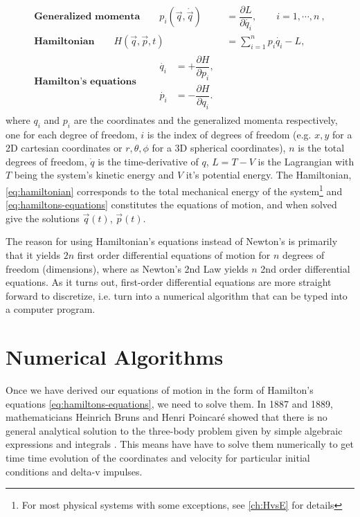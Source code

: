 \begin{align}
\textbf{Generalized momenta} \qquad p_i(\vec{q},\dot{\vec{q}}) &= \dfrac{\partial L}{\partial \dot{q_i}}, \qquad i = 1,\cdots, n \ , \label{eq:generalized-momenta} \\[1cm]
\textbf{Hamiltonian} \qquad H(\vec{q}, \vec{p}, t) &= \sum\limits_{i=1}^n p_i \dot{q_i} - L \label{eq:hamiltonian}, \\[1cm]
\textbf{Hamilton's equations} \qquad
\begin{split}
\label{eq:hamiltons-equations}
\dot{q_i} &= +\dfrac{\partial H}{\partial p_i} ,
\\[0.2cm]
\dot{p_i} &= -\dfrac{\partial H}{\partial q_i}.
\end{split}
\end{align}
where $q_i$ and $p_i$ are the coordinates and the generalized momenta respectively, one for each degree of freedom, $i$ is the index of degrees of freedom (e.g. $x, y$ for a 2D cartesian coordinates or  $r, \theta, \phi$ for a 3D spherical coordinates), $n$ is the total degrees of freedom, $\dot{q}$ is the time-derivative of $q$, $L = T - V$ is the Lagrangian with $T$ being the system's kinetic energy and $V$ it's potential energy. The Hamiltonian, \cref{eq:hamiltonian} corresponds to the total mechanical energy of the system\footnote{For most physical systems with some exceptions, see \cref{ch:HvsE} for details} and \cref{eq:hamiltons-equations} constitutes the equations of motion, and when solved give the solutions $\vec{q}(t)$, $\vec{p}(t)$.

The reason for using Hamiltonian's equations instead of Newton's is primarily that it yields $2 n$ first order differential equations of motion for $n$ degrees of freedom (dimensions), where as Newton's 2nd Law yields $n$ 2nd order differential equations. As it turns out, first-order differential equations are more straight forward to discretize, i.e. turn into a numerical algorithm that can be typed into a computer program.

\section{Numerical Algorithms}
Once we have derived our equations of motion in the form of Hamilton's equations \cref{eq:hamiltons-equations}, we need to solve them. In 1887 and 1889, mathematicians Heinrich Bruns and Henri Poincaré showed that there is no general analytical solution to the three-body problem given by simple algebraic expressions and integrals \cite{Gowers2008}. This means have have to solve them numerically to get time time evolution of the coordinates and velocity for particular initial conditions and delta-v impulses.

